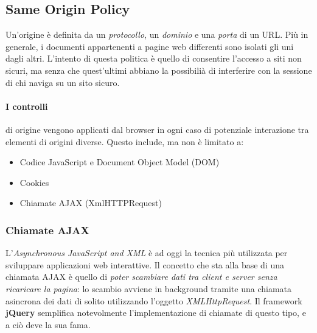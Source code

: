 \subsection{Same Origin Policy}
Un'origine è definita da un \textit{protocollo}, un \textit{dominio} e una \textit{porta} di un URL. Più in generale, i documenti appartenenti a pagine web differenti sono isolati gli uni dagli altri. L'intento di questa politica è quello di consentire l'accesso a siti non sicuri, ma senza che quest'ultimi abbiano la possibilià di interferire con la sessione di chi naviga su un sito sicuro. \cite{w3c:sop}

\paragraph{I controlli} di origine vengono applicati dal browser in ogni caso di potenziale interazione tra elementi di origini diverse. Questo include, ma non è limitato a:
\begin{itemize}
    \item Codice JavaScript e Document Object Model (DOM)
    \item Cookies
    \item Chiamate AJAX (XmlHTTPRequest)
\end{itemize}

\subsubsection{Chiamate AJAX}
L'\emph{Asynchronous JavaScript and XML} è ad oggi la tecnica più utilizzata per sviluppare applicazioni web interattive. Il concetto che sta alla base di una chiamata AJAX è quello di \textit{poter scambiare dati tra client e server senza ricaricare la pagina}: lo scambio avviene in background tramite una chiamata asincrona dei dati di solito utilizzando l’oggetto \textsl{XMLHttpRequest}. Il framework \textbf{jQuery} semplifica notevolmente l'implementazione di chiamate di questo tipo, e a ciò deve la sua fama.

